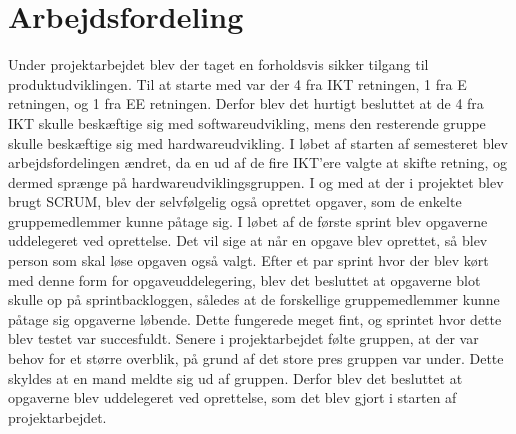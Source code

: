 \section{Arbejdsfordeling}
Under projektarbejdet blev der taget en forholdsvis sikker tilgang til produktudviklingen. Til at starte med var der 4 fra IKT retningen, 1 fra E retningen, og 
1 fra EE retningen. Derfor blev det hurtigt besluttet at de 4 fra IKT skulle beskæftige sig med softwareudvikling, mens den resterende gruppe skulle beskæftige 
sig med hardwareudvikling. I løbet af starten af semesteret blev arbejdsfordelingen ændret, da en ud af de fire IKT’ere valgte at skifte retning, og dermed 
sprænge på hardwareudviklingsgruppen. 
I og med at der i projektet blev brugt SCRUM, blev der selvfølgelig også oprettet opgaver, som de enkelte gruppemedlemmer kunne påtage sig. I løbet af de første 
sprint blev opgaverne uddelegeret ved oprettelse. Det vil sige at når en opgave blev oprettet, så blev person som skal løse opgaven også valgt. Efter et par 
sprint hvor der blev kørt med denne form for opgaveuddelegering, blev det besluttet at opgaverne blot skulle op på sprintbackloggen, således at de forskellige 
gruppemedlemmer kunne påtage sig opgaverne løbende. Dette fungerede meget fint, og sprintet hvor dette blev testet var succesfuldt. Senere i projektarbejdet 
følte gruppen, at der var behov for et større overblik, på grund af det store pres gruppen var under. Dette skyldes at en mand meldte sig ud af gruppen. Derfor 
blev det besluttet at opgaverne blev uddelegeret ved oprettelse, som det blev gjort i starten af projektarbejdet.
